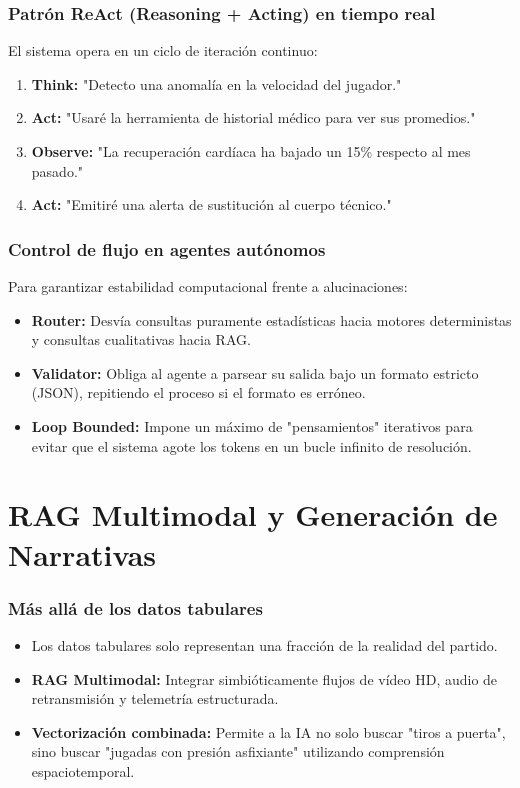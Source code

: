 \documentclass[aspectratio=169]{beamer}
\begin{document}
\begin{frame}\frametitle{Patrón ReAct (Reasoning + Acting) en tiempo real}
El sistema opera en un ciclo de iteración continuo:
\begin{enumerate}
    \item \textbf{Think:} "Detecto una anomalía en la velocidad del jugador."
    \item \textbf{Act:} "Usaré la herramienta de historial médico para ver sus promedios."
    \item \textbf{Observe:} "La recuperación cardíaca ha bajado un 15\% respecto al mes pasado."
    \item \textbf{Act:} "Emitiré una alerta de sustitución al cuerpo técnico."
\end{enumerate}
\end{frame}

\begin{frame}\frametitle{Control de flujo en agentes autónomos}
Para garantizar estabilidad computacional frente a alucinaciones:
\begin{itemize}
    \item \textbf{Router:} Desvía consultas puramente estadísticas hacia motores deterministas y consultas cualitativas hacia RAG.
    \item \textbf{Validator:} Obliga al agente a parsear su salida bajo un formato estricto (JSON), repitiendo el proceso si el formato es erróneo.
    \item \textbf{Loop Bounded:} Impone un máximo de "pensamientos" iterativos para evitar que el sistema agote los tokens en un bucle infinito de resolución.
\end{itemize}
\end{frame}

\section{RAG Multimodal y Generación de Narrativas}
\frame{\sectionpage}

\begin{frame}\frametitle{Más allá de los datos tabulares}
\begin{itemize}
    \item Los datos tabulares solo representan una fracción de la realidad del partido.
    \item \textbf{RAG Multimodal:} Integrar simbióticamente flujos de vídeo HD, audio de retransmisión y telemetría estructurada.
    \item \textbf{Vectorización combinada:} Permite a la IA no solo buscar "tiros a puerta", sino buscar "jugadas con presión asfixiante" utilizando comprensión espaciotemporal.
\end{itemize}
\end{frame}
\end{document}
